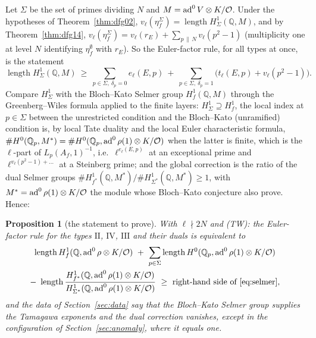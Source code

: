 \documentclass[11pt]{amsart}
\newtheorem{proposition}[theorem]{Proposition}
\theoremstyle{definition}
\newcommand{\Q}{\mathbb{Q}}\newcommand{\Z}{\mathbb{Z}}\newcommand{\F}{\mathbb{F}}
\begin{document}
Let $\Sigma$ be the set of primes dividing $N$ and $M=\operatorname{ad}^0 V\otimes K/\mathcal{O}$. Under the hypotheses of Theorem~\ref{thm:dfg02}, $v_\ell(\eta_f^\Sigma)=\operatorname{length}H^1_\Sigma(\Q,M)$, and by Theorem~\ref{thm:dfg14}, $v_\ell(\eta_f^\Sigma)=v_\ell(r_E)+\sum_{p\,\|\,N}v_\ell(p^2-1)$ (multiplicity one at level $N$ identifying $\eta^\emptyset_f$ with $r_E$). So the Euler-factor rule, for all types at once, is the statement
\begin{equation}\label{eq:selmer}
\operatorname{length}H^1_\Sigma(\Q,M)\ \ge\ \sum_{p\in\Sigma,\ \delta_p=0}e_\ell(E,p)\ +\ \sum_{p\in\Sigma,\ \delta_p=1}\bigl(t_\ell(E,p)+v_\ell(p^2-1)\bigr).
\end{equation}
Compare $H^1_\Sigma$ with the Bloch--Kato Selmer group $H^1_f(\Q,M)$ through the Greenberg--Wiles formula applied to the finite layers: $H^1_\Sigma\supseteq H^1_f$, the local index at $p\in\Sigma$ between the unrestricted condition and the Bloch--Kato (unramified) condition is, by local Tate duality and the local Euler characteristic formula, $\#H^0(\Q_p,M^*)=\#H^0(\Q_p,\ad\rho(1)\otimes K/\mathcal{O})$ when the latter is finite, which is the $\ell$-part of $L_p(A_f,1)^{-1}$, i.e.\ $\ell^{e_\ell(E,p)}$ at an exceptional prime and $\ell^{v_\ell(p^2-1)+\dots}$ at a Steinberg prime; and the global correction is the ratio of the dual Selmer groups $\#H^1_{f^*}(\Q,M^*)/\#H^1_{\Sigma^*}(\Q,M^*)\ge1$, with $M^*=\operatorname{ad}^0\rho(1)\otimes K/\mathcal{O}$ the module whose Bloch--Kato conjecture \cite{DFG04} also prove. Hence:

\begin{proposition}[the statement to prove]\label{prop:selmer}
With $\ell\nmid2N$ and (TW): the Euler-factor rule for the types $\mathrm{II}$, $\mathrm{IV}$, $\mathrm{III}$ and their duals is equivalent to
\begin{multline*}
\operatorname{length}H^1_f(\Q,\ad\rho\otimes K/\mathcal{O})\ +\ \sum_{p\in\Sigma}\operatorname{length}H^0(\Q_p,\ad\rho(1)\otimes K/\mathcal{O})\\
-\ \operatorname{length}\frac{H^1_{f^*}(\Q,\ad\rho(1)\otimes K/\mathcal{O})}{H^1_{\Sigma^*}(\Q,\ad\rho(1)\otimes K/\mathcal{O})}\ \ge\ \text{right-hand side of \eqref{eq:selmer}},
\end{multline*}
and the data of Section~\ref{sec:data} say that the Bloch--Kato Selmer group supplies the Tamagawa exponents and the dual correction vanishes, except in the configuration of Section~\ref{sec:anomaly}, where it equals one.
\end{proposition}
\end{document}

